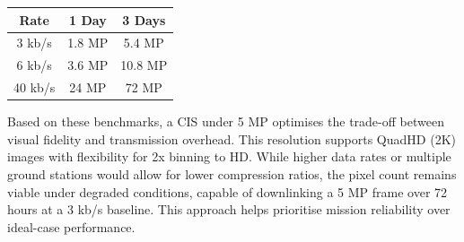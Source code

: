 \begin{indentedfigure}
    \centering
    \begin{tabular}{|c|c|c|}
        \hline
        \textbf{Rate} & \textbf{1 Day} & \textbf{3 Days} \\
        \hline
        3 kb/s & 1.8 MP & 5.4 MP \\
        \hline
        6 kb/s & 3.6 MP & 10.8 MP \\
        \hline
        40 kb/s & 24 MP & 72 MP \\
        \hline
    \end{tabular}
    \caption{Approximate megapixel count for assumed Comms requirements}
    \label{tab:v1-pixel-count}
\end{indentedfigure}

Based on these benchmarks, a CIS under 5 MP optimises the trade-off between visual fidelity and transmission overhead.
This resolution supports QuadHD (2K) images with flexibility for 2x binning to HD.
While higher data rates or multiple ground stations would allow for lower compression ratios, the pixel count remains viable under degraded conditions, capable of downlinking a 5 MP frame over 72 hours at a 3 kb/s baseline.
This approach helps prioritise mission reliability over ideal-case performance.